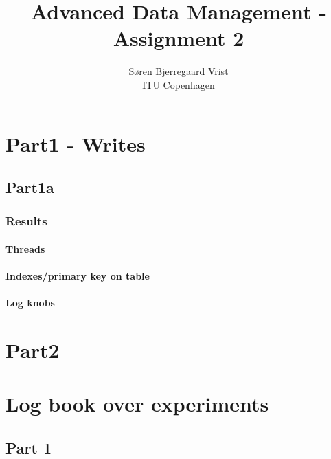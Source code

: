 
\title{Advanced Data Management - Assignment 2}
\author{S\o ren Bjerregaard Vrist\\ITU Copenhagen}


\maketitle

\chapter{Part1 - Writes}
\section{Part1a}

\subsection{Results}
\subsubsection{Threads}
\subsubsection{Indexes/primary key on table}
\subsubsection{Log knobs}


\chapter{Part2}


\chapter{Log book over experiments}

\section{Part 1}

